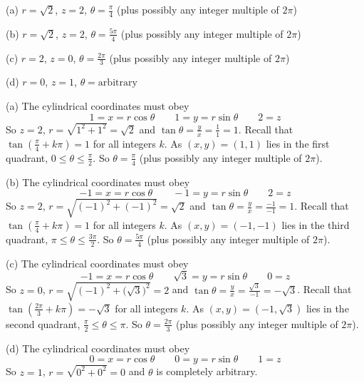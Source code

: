 %

\begin{answer}
(a) $r=\sqrt{2}$, $z=2$, $\theta=\frac{\pi}{4}$ (plus possibly
any integer multiple of $2\pi$)

(b) $r=\sqrt{2}$, $z=2$, $\theta=\frac{5\pi}{4}$ (plus possibly
any integer multiple of $2\pi$)

(c) $r=2$, $z=0$, $\theta=\frac{2\pi}{3}$ (plus possibly
any integer multiple of $2\pi$)

(d) $r=0$, $z=1$, $\theta=\text{arbitrary}$

\end{answer}

\begin{solution}
(a) The cylindrical coordinates must obey
\begin{equation*}
1=x=r\cos\theta\qquad
1=y=r\sin\theta\qquad
2=z
\end{equation*}
So $z=2$, $r=\sqrt{1^2+1^2}=\sqrt{2}$ and $\tan\theta=\frac{y}{x}
=\frac{1}{1}=1$. Recall that $\tan\left(\frac{\pi}{4}+k\pi\right)=1$
for all integers $k$.  As $(x,y)=(1,1)$ lies in the first quadrant,
$0\le\theta\le\frac{\pi}{2}$. So $\theta=\frac{\pi}{4}$ (plus possibly
any integer multiple of $2\pi$). 

(b) The cylindrical coordinates must obey
\begin{equation*}
-1=x=r\cos\theta\qquad
-1=y=r\sin\theta\qquad
2=z
\end{equation*}
So $z=2$, $r=\sqrt{(-1)^2+(-1)^2}=\sqrt{2}$ and $\tan\theta=\frac{y}{x}
=\frac{-1}{-1}=1$. Recall that $\tan\left(\frac{\pi}{4}+k\pi\right)=1$
for all integers $k$. As $(x,y)=(-1,-1)$ lies in the third quadrant,
$\pi\le\theta\le\frac{3\pi}{2}$. So $\theta=\frac{5\pi}{4}$ (plus possibly
any integer multiple of $2\pi$).

(c) The cylindrical coordinates must obey
\begin{equation*}
-1=x=r\cos\theta\qquad
\sqrt{3}=y=r\sin\theta\qquad
0=z
\end{equation*}
So $z=0$, $r=\sqrt{(-1)^2+\big(\sqrt{3}\big)^2}=2$ and 
$\tan\theta=\frac{y}{x} =\frac{\sqrt{3}}{-1}=-\sqrt{3}$. 
Recall that $\tan\left(\frac{2\pi}{3}+k\pi\right)=-\sqrt{3}$
for all integers $k$.
As $(x,y)=(-1,\sqrt{3})$ lies in the second quadrant,
$\frac{\pi}{2}\le\theta\le\pi$. So $\theta=\frac{2\pi}{3}$ (plus possibly
any integer multiple of $2\pi$). 

(d) The cylindrical coordinates must obey
\begin{equation*}
0=x=r\cos\theta\qquad
0=y=r\sin\theta\qquad
1=z
\end{equation*}
So $z=1$, $r=\sqrt{0^2+0^2}=0$ and 
$\theta$ is completely arbitrary. 

\end{solution}


